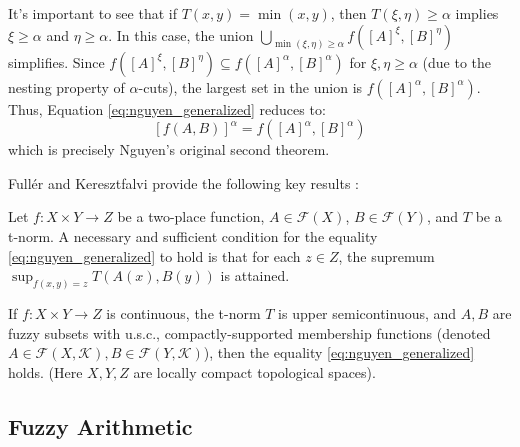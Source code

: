 It's important to see that if $T(x,y) = \min(x,y)$, then $T(\xi, \eta) \ge \alpha$ implies $\xi \ge \alpha$ and $\eta \ge \alpha$. In this case, the union $\bigcup_{\min(\xi, \eta) \ge \alpha} f([A]^\xi, [B]^\eta)$ simplifies. Since $f([A]^\xi, [B]^\eta) \subseteq f([A]^\alpha, [B]^\alpha)$ for $\xi, \eta \ge \alpha$ (due to the nesting property of $\alpha$-cuts), the largest set in the union is $f([A]^\alpha, [B]^\alpha)$. Thus, Equation \eqref{eq:nguyen_generalized} reduces to:
\[
[f(A, B)]^\alpha = f([A]^\alpha, [B]^\alpha)
\]
which is precisely Nguyen's original second theorem.

Fullér and Keresztfalvi provide the following key results \cite[Thms. 1.9.1, 1.9.2]{FULLER2}:
\begin{theorem}
    Let $f: X \times Y \to Z$ be a two-place function, $A \in \mathcal{F}(X)$, $B \in \mathcal{F}(Y)$, and $T$ be a t-norm. A necessary and sufficient condition for the equality \eqref{eq:nguyen_generalized} to hold is that for each $z \in Z$, the supremum $\sup_{f(x,y)=z} T(A(x), B(y))$ is attained.
\end{theorem}

\begin{theorem}
    If $f: X \times Y \to Z$ is continuous, the t-norm $T$ is upper semicontinuous, and $A, B$ are fuzzy subsets with u.s.c., compactly-supported membership functions (denoted $A \in \mathcal{F}(X, \mathcal{K}), B \in \mathcal{F}(Y, \mathcal{K})$), then the equality \eqref{eq:nguyen_generalized} holds.
    (Here $X, Y, Z$ are locally compact topological spaces).
\end{theorem}












\subsection{Fuzzy Arithmetic}
\label{sec:fuzzy_arithmetic}

